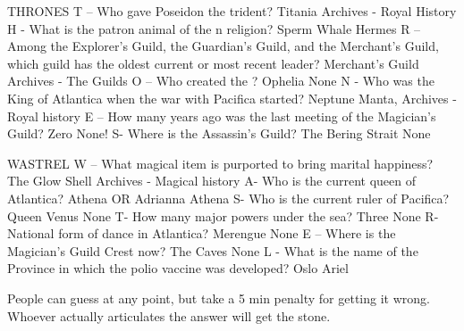 \documentclass[green]{NeptuneBall}
\begin{document}
\name{\gWishingStone{}}

THRONES
T – Who gave Poseidon the trident?
Titania
Archives - Royal History
H - What is the patron animal of the \pAtlantica{}n religion?
Sperm Whale
Hermes
R –  Among the Explorer's Guild, the Guardian's Guild, and the Merchant's Guild, which guild has the oldest current or most recent leader?
Merchant’s Guild
Archives - The Guilds
O – Who created the \sArtifactTwo{}?
Ophelia
None
N - Who was the King of Atlantica when the war with Pacifica started?
Neptune
Manta, Archives - Royal history
E – How many years ago was the last meeting of the Magician’s Guild?
Zero
None!
S- Where is the Assassin's Guild?
The Bering Strait
None

WASTREL
W – What magical item is purported to bring marital happiness?
The Glow Shell
Archives - Magical history
A- Who is the current queen of Atlantica?
Athena OR Adrianna
Athena
S- Who is the current ruler of Pacifica?
Queen Venus
None
T- How many major powers under the sea?
Three
None
R- National form of dance in Atlantica?
Merengue
None
E – Where is the Magician’s Guild Crest now?
The Caves
None
L - What is the name of the Province in which the polio vaccine was developed?
Oslo
Ariel

People can guess at any point, but take a 5 min penalty for getting it wrong. Whoever actually articulates the answer will get the stone.
\end{document}
